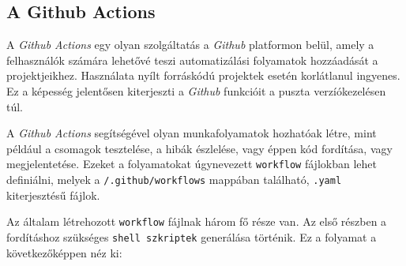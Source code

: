 \subsection{A Github Actions}

A \textit{Github Actions} egy olyan szolgáltatás a \textit{Github} platformon
belül, amely a felhasználók számára lehetővé teszi automatizálási folyamatok
hozzáadását a projektjeikhez. Használata nyílt forráskódú projektek esetén
korlátlanul ingyenes. Ez a képesség jelentősen kiterjeszti a \textit{Github}
funkcióit a puszta verzíókezelésen túl.

A \textit{Github Actions} segítségével olyan munkafolyamatok hozhatóak létre,
mint például a csomagok tesztelése, a hibák észlelése, vagy éppen kód fordítása,
vagy megjelentetése. Ezeket a folyamatokat úgynevezett \texttt{workflow}
fájlokban lehet definiálni, melyek a \texttt{/.github/workflows} mappában
található, \texttt{.yaml} kiterjesztésű fájlok.

Az általam létrehozott \texttt{workflow} fájlnak három fő része van. Az első
részben a fordításhoz szükséges \texttt{shell szkriptek} generálása történik.
Ez a folyamat a következőképpen néz ki:

